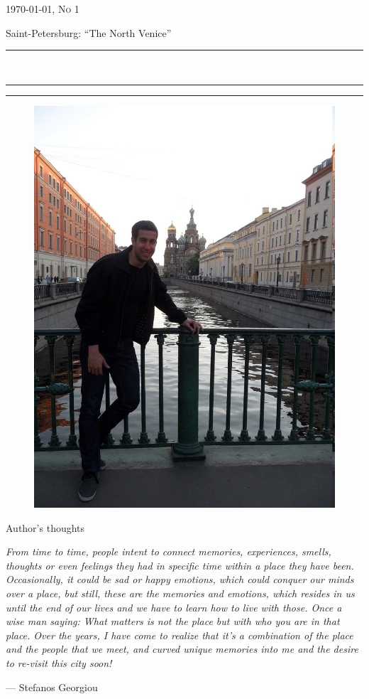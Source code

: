 \documentclass[10pt,a4paper]{article} %
\newcommand{\HorRule}[1]{\noindent\rule{\linewidth}{#1}} %
\newcommand{\SepRule}{\noindent	%
\begin{center}
\rule{250pt}{1pt} %
\end{center}
}
\newcommand{\NewsletterName}[1]{ %
\begin{center}
\Huge \usefont{T1}{fvs}{b}{n} %
#1
\end{center}	
\par \normalsize \normalfont}
\newcommand{\JournalIssue}[1]{ %
\hfill \textsc{\mydate \today, No #1} %
\par \normalsize \normalfont}
\newcommand{\NewsItem}[1]{ %
\usefont{T1}{fvs}{n}{n} %
\vspace{24pt}\large #1\vspace{3pt} %
\par \normalsize \normalfont}
\begin{document}
\JournalIssue{1} %

\NewsletterName{Saint-Petersburg: ``The North Venice''} %

\noindent\HorRule{3pt} \\[-0.75\baselineskip] %
\HorRule{1pt} %


\vspace{0.5cm}
\SepRule
\vspace{-0.5cm}

\begin{center}
\begin{minipage}[h]{0.75\linewidth}
\begin{figure}
\includegraphics[width=0.38 \textwidth]{media/front_picture.jpg}
\\
\end{figure}
	
\NewsItem{Author's thoughts} %
\vspace{3pt} %
\textit{
From time to time, people intent to connect memories, experiences, smells, 
thoughts or even feelings they had in specific time within a place they have been. 
Occasionally, it could be sad or happy emotions, which could conquer our minds over a place, 
but still, these are the memories and emotions, 
which resides in us until the end of our lives and we have to learn how to 
live with those. 
Once a wise man saying: 
\textit{What matters is not the place but with who you are in that place}. 
Over the years, I have come to realize that it's a combination of the place and 
the people that we meet, and curved unique memories into me and the desire to 
re-visit this city soon!
}
\par\hfill --- Stefanos Georgiou
\end{minipage}
\end{center}
\end{document}
